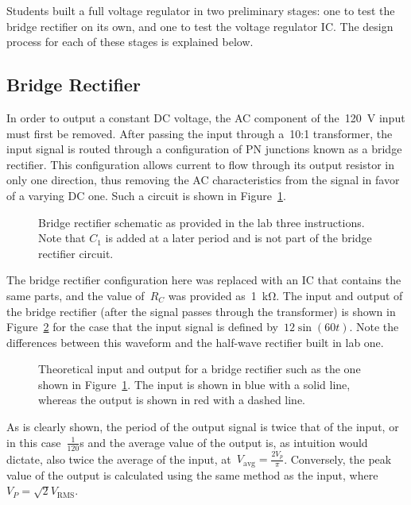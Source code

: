 Students built a full voltage regulator in two preliminary stages: one to test
the bridge rectifier on its own, and one to test the voltage regulator IC.  The
design process for each of these stages is explained below.

\subsection{Bridge Rectifier}
In order to output a constant DC voltage, the AC component of
the~\SI{120}{\volt} input must first be removed.  After passing the input
through a~10:1 transformer, the input signal is routed through a configuration
of PN junctions known as a bridge rectifier.  This configuration allows current
to flow through its output resistor in only one direction, thus removing the AC
characteristics from the signal in favor of a varying DC one.  Such a circuit
is shown in Figure~\ref{fig:bridgeSchem}.
%
\begin{figure}[H]
	\centering
	
	\parbox{.6\textwidth}{
	\caption{Bridge rectifier schematic as provided in the lab three
	instructions.  Note that $C_1$ is added at a later period and is not part
	of the bridge rectifier circuit.}
	\label{fig:bridgeSchem}}
\end{figure}
%
The bridge rectifier configuration here was replaced with an IC that contains
the same parts, and the value of~$R_C$ was provided as~\SI{1}{\kilo\ohm}.  The
input and output of the bridge rectifier (after the signal passes through the
transformer) is shown in Figure~\ref{fig:bridgeRectOut} for the case that the
input signal is defined by~$12 \sin(60t)$.  Note the differences between this
waveform and the half-wave rectifier built in lab one.
%
\begin{figure}[H]
	\centering
	
	\parbox{.6\textwidth}{
	\caption{Theoretical input and output for a bridge rectifier such as the
	one shown in Figure~\ref{fig:bridgeSchem}.  The input is shown in blue with
	a solid line, whereas the output is shown in red with a dashed line.}
	\label{fig:bridgeRectOut}
	}
\end{figure}
%
As is clearly shown, the period of the output signal is twice that of the
input, or in this case~$\frac{1}{120}$\si{\second} and the average value of the
output is, as intuition would dictate, also twice the average of the input,
at~$V_\text{avg} = \frac{2 V_p}{\pi}$.  Conversely, the peak value of the
output is calculated using the same method as the input,
where~$V_P=\sqrt{2}V_\mathrm{RMS}$.

